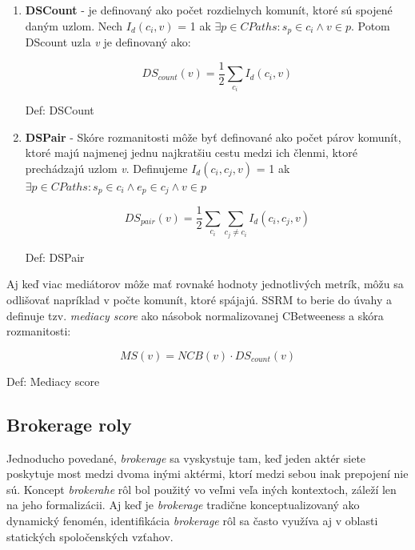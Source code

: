 \documentclass[slovak,master,public,dept460,male,cpdeclaration,oneside]{diploma}
\begin{document}
\begin{sloppypar}
\begin{enumerate}
\item 

\textbf{DSCount} - je definovaný ako počet rozdielnych komunít, ktoré sú spojené daným uzlom. Nech \textit{${I_d}({c_i}, v)$} = 1 ak \textit{${\exists p \in CPaths: {s_p} \in {c_i} \wedge	v \in p}$}. Potom DScount uzla \textit{v} je definovaný ako:


\begin{mycapequ}[!ht]
   \begin{equation*}
    DS_{count}(v) = \frac{1}{2}\sum_{c_{i}} I_{d}(c_{i},v)
   \end{equation*}
   \caption{Def: DSCount}
\end{mycapequ}


\item \textbf{DSPair} - Skóre rozmanitosti môže byť definované ako počet párov komunít, ktoré majú najmenej jednu najkratšiu cestu medzi ich členmi, ktoré prechádzajú uzlom \textit{v}. Definujeme  \textit{${I_d}({c_i},{c_j}, v)$} = 1 ak \textit{${\exists p \in CPaths: {s_p} \in {c_i} \wedge {e_p} \in {c_j} \wedge	v \in p}$}


\begin{mycapequ}[!ht]
   \begin{equation*}
   DS_{pair}(v) = \frac{1}{2}\sum_{c_{i}} \sum_{c_{j}\neq c_{i}} I_{d}(c_{i},c_{j},v)
   \end{equation*}
   \caption{Def: DSPair}
\end{mycapequ}



\end{enumerate}
\end{sloppypar}

Aj keď viac mediátorov môže mať rovnaké hodnoty jednotlivých metrík, 
môžu sa odlišovať napríklad v počte komunít, ktoré spájajú. SSRM to berie do úvahy a definuje tzv. \textit{mediacy score} ako násobok normalizovanej CBetweeness a skóra rozmanitosti:

\begin{mycapequ}[!ht]
   \begin{equation*}
 		MS(v) = NCB(v) \cdot DS_{count}(v) 
   \end{equation*}
   \caption{Def: Mediacy score}
\end{mycapequ}


\subsection{Brokerage roly}
Jednoducho povedané, \textit{brokerage} sa vyskystuje tam, keď jeden aktér siete poskytuje most medzi dvoma inými aktérmi, ktorí medzi sebou inak prepojení nie sú. Koncept \textit{brokerahe} rôl bol použitý vo veľmi veľa iných kontextoch, záleží len na jeho formalizácii. Aj keď je \textit{brokerage} tradične konceptualizovaný ako dynamický fenomén, identifikácia \textit{brokerage} rôl sa často využíva aj v oblasti statických spoločenských vzťahov. 
\end{document}
